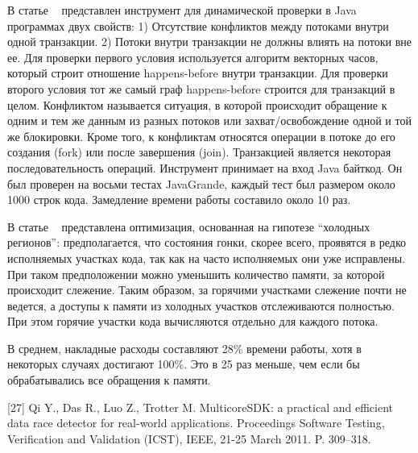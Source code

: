 В статье ~\cite{Sadowski:2009} представлен инструмент для динамической проверки в Java программах двух свойств:
1) Отсутствие конфликтов между потоками внутри одной транзакции.
2) Потоки внутри транзакции не должны влиять на потоки вне ее. 
Для проверки первого условия используется алгоритм векторных часов, который строит отношение happens-before внутри транзакции. Для проверки второго условия тот же самый граф happens-before строится для транзакций в целом. 
Конфликтом называется ситуация, в которой происходит обращение к одним и тем же данным из разных потоков или захват/освобождение одной и той же блокировки. Кроме того, к конфликтам относятся операции в потоке до его создания (fork) или после завершения (join). Транзакцией является некоторая последовательность операций. 
Инструмент принимает на вход Java байткод. Он был проверен на восьми тестах JavaGrande, каждый тест был размером около 1000 строк кода. Замедление времени работы составило около 10 раз. 

В статье ~\cite{Marino:2009:PLDI, Marino:2009} представлена оптимизация, основанная на гипотезе “холодных регионов”: предполагается, что состояния гонки, скорее всего, проявятся в редко исполняемых участках кода, так как на часто исполняемых они уже исправлены. При таком предположении можно уменьшить количество памяти, за которой происходит слежение. Таким образом, за горячими участками слежение почти не ведется, а доступы к памяти из холодных участков отслеживаются полностью. При этом горячие участки кода вычисляются отдельно для каждого потока.

В среднем, накладные расходы составляют 28\% времени работы, хотя в некоторых случаях достигают 100\%. Это в 25 раз меньше, чем если бы обрабатывались все обращения к памяти.

[27] Qi Y., Das R., Luo Z., Trotter M. MulticoreSDK: a practical and efficient data race detector for real-world applications. Proceedings Software Testing, Verification and Validation (ICST), IEEE, 21-25 March 2011. P. 309–318.


